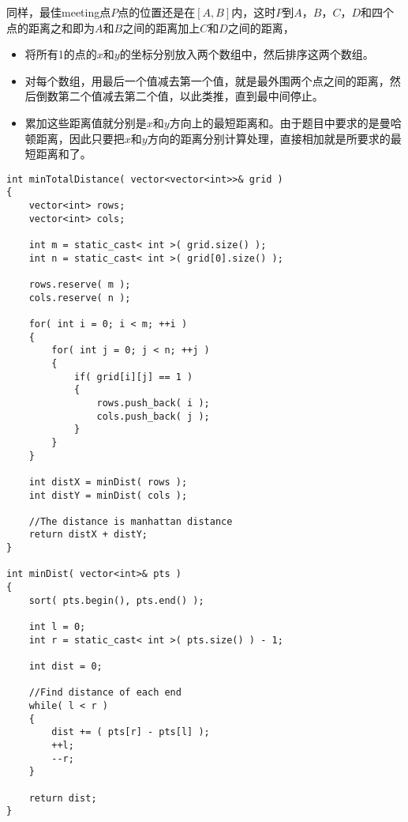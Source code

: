 \begin{figure}[H]
\end{figure}
同样，最佳meeting点$P$点的位置还是在$[A, B]$内，这时$P$到$A$，$B$，$C$，$D$和四个点的距离之和即为$A$和$B$之间的距离加上$C$和$D$之间的距离，
\par
\begin{itemize}
    \item 将所有1的点的$x$和$y$的坐标分别放入两个数组中，然后排序这两个数组。
    \item 对每个数组，用最后一个值减去第一个值，就是最外围两个点之间的距离，然后倒数第二个值减去第二个值，以此类推，直到最中间停止。
    \item 累加这些距离值就分别是$x$和$y$方向上的最短距离和。由于题目中要求的是曼哈顿距离，因此只要把$x$和$y$方向的距离分别计算处理，直接相加就是所要求的最短距离和了。
\end{itemize}
\setcounter{lstlisting}{0}
\begin{lstlisting}[style=customc, caption={Sorting}]
int minTotalDistance( vector<vector<int>>& grid )
{
    vector<int> rows;
    vector<int> cols;

    int m = static_cast< int >( grid.size() );
    int n = static_cast< int >( grid[0].size() );

    rows.reserve( m );
    cols.reserve( n );

    for( int i = 0; i < m; ++i )
    {
        for( int j = 0; j < n; ++j )
        {
            if( grid[i][j] == 1 )
            {
                rows.push_back( i );
                cols.push_back( j );
            }
        }
    }

    int distX = minDist( rows );
    int distY = minDist( cols );

    //The distance is manhattan distance
    return distX + distY;
}

int minDist( vector<int>& pts )
{
    sort( pts.begin(), pts.end() );

    int l = 0;
    int r = static_cast< int >( pts.size() ) - 1;

    int dist = 0;

    //Find distance of each end
    while( l < r )
    {
        dist += ( pts[r] - pts[l] );
        ++l;
        --r;
    }

    return dist;
}
\end{lstlisting}